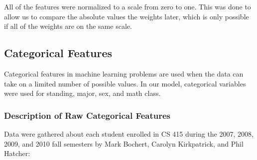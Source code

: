 \documentclass[letterpaper,11pt]{article}
\begin{document}
All of the features were normalized to a scale from zero to one.  This was done to allow us to compare the absolute values the weights later, which is only possible if all of the weights are on the same scale.

\subsection{Categorical Features}

Categorical features in machine learning problems are used when the data can take on a limited number of possible values.  In our model, categorical variables were used for standing, major, sex, and math class.

\subsubsection{Description of Raw Categorical Features}

Data were gathered about each student enrolled in CS 415 during the 2007, 2008, 2009, and 2010 fall semesters by Mark Bochert, Carolyn Kirkpatrick, and Phil Hatcher:
\end{document}
